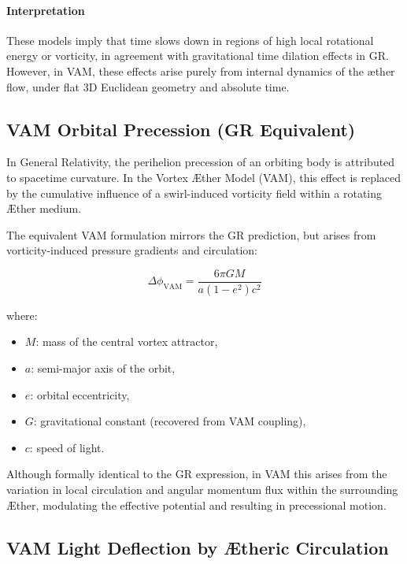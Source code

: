 \paragraph{Interpretation}

These models imply that time slows down in regions of high local rotational energy or vorticity, in agreement with gravitational time dilation effects in GR. However, in VAM, these effects arise purely from internal dynamics of the æther flow, under flat 3D Euclidean geometry and absolute time.

\subsection*{VAM Orbital Precession (GR Equivalent)}

In General Relativity, the perihelion precession of an orbiting body is attributed to spacetime curvature. In the Vortex Æther Model (VAM), this effect is replaced by the cumulative influence of a swirl-induced vorticity field within a rotating Æther medium.

The equivalent VAM formulation mirrors the GR prediction, but arises from vorticity-induced pressure gradients and circulation:

\begin{equation}
    \Delta\phi_{\text{VAM}} =
    \frac{6\pi G M}{a(1 - e^2) c^2}
\end{equation}

where:
\begin{itemize}
    \item \( M \): mass of the central vortex attractor,
    \item \( a \): semi-major axis of the orbit,
    \item \( e \): orbital eccentricity,
    \item \( G \): gravitational constant (recovered from VAM coupling),
    \item \( c \): speed of light.
\end{itemize}

Although formally identical to the GR expression, in VAM this arises from the variation in local circulation and angular momentum flux within the surrounding Æther, modulating the effective potential and resulting in precessional motion.
\subsection*{VAM Light Deflection by Ætheric Circulation}

